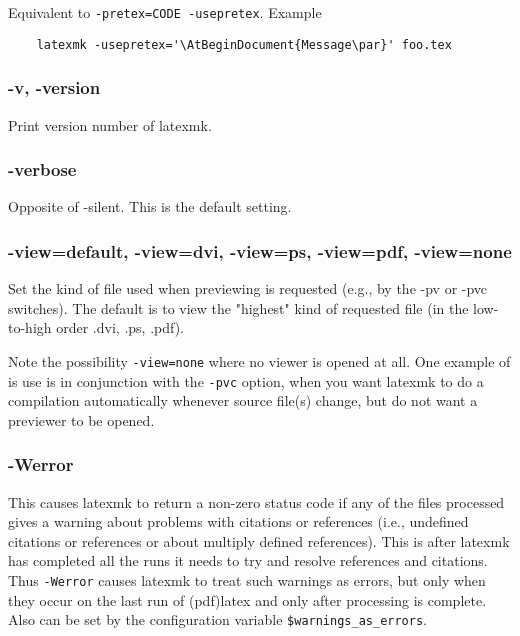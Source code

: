 Equivalent to \verb|-pretex=CODE -usepretex|.  Example

\begin{verbatim}
	latexmk -usepretex='\AtBeginDocument{Message\par}' foo.tex
\end{verbatim}

\subsubsection{-v, -version}

Print version number of latexmk.

\subsubsection{-verbose}

Opposite of -silent.  This is the default setting.

\subsubsection{-view=default, -view=dvi, -view=ps, -view=pdf, -view=none}

Set the kind of file used when previewing is requested (e.g., by the -pv or
-pvc switches).  The default is to view the "highest" kind of requested file
(in  the  low-to-high  order  .dvi,  .ps, .pdf).

Note  the  possibility  \verb|-view=none|  where no viewer is opened at all.
One example of is use is in conjunction with the \verb|-pvc|  option,  when  you
want latexmk to do a compilation automatically whenever source file(s) change,
but do not want a  previewer  to be opened.

\subsubsection{-Werror}

This  causes  latexmk to return a non-zero status code if any of the files
processed gives a warning about  problems  with  citations  or references
(i.e., undefined citations or references or about multiply defined references).
This is after  latexmk  has completed  all  the  runs it needs to try and
resolve references and citations.  Thus \verb|-Werror| causes latexmk to treat
such  warnings  as  errors,  but  only  when they occur on the last run of
(pdf)latex and only after processing is complete.  Also  can  be set by the
configuration variable \verb|$warnings_as_errors|.

